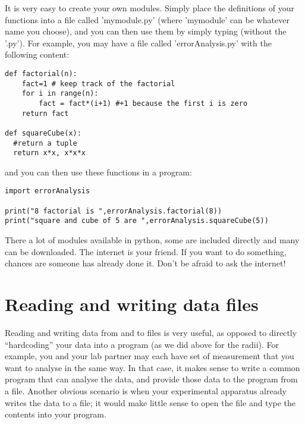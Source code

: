 It is very easy to create your own modules. Simply place the definitions of your functions into a file called 'mymodule.py' (where 'mymodule' can be whatever name you choose), and you can then use them by simply typing  (without the '.py'). For example, you may have a file called 'errorAnalysis.py' with the following content:
\begin{lstlisting}[frame=single] 
def factorial(n):
    fact=1 # keep track of the factorial
    for i in range(n):
        fact = fact*(i+1) #+1 because the first i is zero
    return fact
    
def squareCube(x):
  #return a tuple
  return x*x, x*x*x    
\end{lstlisting}
and you can then use these functions in a program:
\begin{lstlisting}[frame=single] 
import errorAnalysis

print("8 factorial is ",errorAnalysis.factorial(8))
print("square and cube of 5 are ",errorAnalysis.squareCube(5))
\end{lstlisting}

There a lot of modules available in python, some are included directly and many can be downloaded. The internet is your friend. If you want to do something, chances are someone has already done it. Don't be afraid to ask the internet!

\section{Reading and writing data files}
Reading and writing data from and to files is very useful, as opposed to directly ``hardcoding'' your data into a program (as we did above for the radii). For example, you and your lab partner may each have  set of measurement that you want to analyse in the same way. In that case, it makes sense to write a common program that can analyse the data, and provide those data to the program from a file. Another obvious scenario is when your experimental apparatus already writes the data to a file; it would make little sense to open the file and type the contents into your program.

